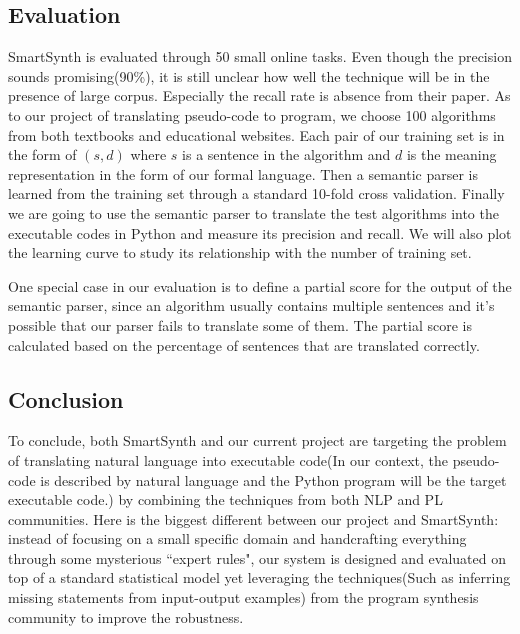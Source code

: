 \documentclass[10pt]{article}
\begin{document}
\subsection{Evaluation}
SmartSynth is evaluated through 50 small online tasks. Even though 
the precision sounds promising(90\%), it is still unclear how well the 
technique will be in the presence of large corpus. Especially the recall
rate is absence from their paper. As to our project of translating pseudo-code to 
program, we choose 100 algorithms from both textbooks and educational websites. Each
pair of our training set is in the form of $(s,d)$ where $s$ is 
a sentence in the algorithm and $d$ is the meaning representation in the form 
of our formal language. Then a semantic parser is learned from the training
set through a standard 10-fold cross validation. Finally we are going to 
use the semantic parser to translate the test algorithms into the executable
codes in Python and measure its precision and recall. 
We will also plot the learning curve to study its relationship with 
the number of training set.  

One special case in our evaluation is to define a partial score for the output 
of the semantic parser, since an algorithm usually contains multiple sentences 
and it's possible that our parser fails to translate some of them. The partial
score is calculated based on the percentage of sentences that are translated
correctly.  

\subsection{Conclusion}
To conclude, both SmartSynth and our current project are targeting the problem 
of translating natural language into executable code(In our context, the pseudo-code
is described by natural language and the Python program will be the target
executable code.) by combining the techniques
from both NLP and PL communities. Here is the biggest different between our 
project and SmartSynth: instead of focusing on a small specific domain
and handcrafting everything through some mysterious ``expert rules", our system
is designed and evaluated on top of a standard statistical model yet leveraging
the techniques(Such as inferring missing statements from input-output examples) 
from the program synthesis community to improve the robustness.



\end{document}

